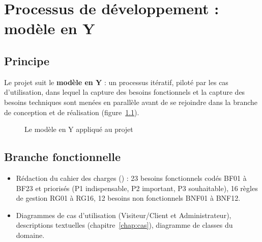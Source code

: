 \chapter{Processus de développement : modèle en Y}

\section{Principe}

Le projet suit le \textbf{modèle en Y} : un processus itératif, piloté par les cas d'utilisation, dans lequel la
capture des besoins fonctionnels et la capture des besoins techniques sont menées en parallèle avant de se
rejoindre dans la branche de conception et de réalisation (figure~\ref{fig:modele-y}).

\begin{figure}[H]
  \centering
  \caption{Le modèle en Y appliqué au projet}\label{fig:modele-y}
\end{figure}

\section{Branche fonctionnelle}

\begin{itemize}
  \item Rédaction du cahier des charges () : 23 besoins fonctionnels codés BF01 à BF23
        et priorisés (P1 indispensable, P2 important, P3 souhaitable), 16 règles de gestion RG01 à RG16,
        12 besoins non fonctionnels BNF01 à BNF12.
  \item Diagrammes de cas d'utilisation (Visiteur/Client et Administrateur), descriptions textuelles
        (chapitre~\ref{chap:cas}), diagramme de classes du domaine.
\end{itemize}

